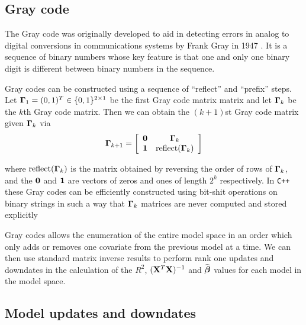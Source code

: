 \documentclass{article}[12pt]
\begin{document}
 
\subsection{Gray code} 
\label{sec:GrayCode}


The Gray code was originally developed to aid in detecting errors in analog to digital conversions in
communications systems by Frank Gray in 1947 \cite[][Section 22.3]{PressEtal2007}. It is a sequence of binary numbers whose key feature is that
one and only one binary digit is different between binary numbers in the sequence. 

Gray codes can be constructed using a sequence of ``reflect'' and ``prefix'' steps.
Let ${\boldsymbol \Gamma}_1 = (0,1)^T \in \{0,1\}^{2\times 1}$ be the first Gray code matrix matrix and let ${\boldsymbol \Gamma}_k$ be the $k$th Gray code matrix. Then we can obtain the $(k+1)$st Gray code matrix given ${\boldsymbol \Gamma}_k$ via 
$$
\displaystyle {\boldsymbol\Gamma}_{k+1} = \left[\begin{array}{cc}
{\bf0} & {\boldsymbol \Gamma}_k \\
{\bf 1}  & \mbox{reflect}({\boldsymbol \Gamma}_k)
\end{array} \right]
$$ 

\noindent where $\mbox{reflect}({\boldsymbol \Gamma}_k)$ is the matrix obtained by reversing the order of rows of ${\boldsymbol \Gamma}_k$, and the ${\bf 0}$ and ${\bf 1}$ are vectors of zeros and ones
of length $2^k$ respectively. In {\tt C++} these Gray codes can be efficiently constructed
using bit-shit operations on binary strings in such a way that ${\boldsymbol \Gamma}_{k}$
matrices are never computed and stored explicitly

Gray codes allows the enumeration of the entire model space in an order which only adds
or removes one covariate from the previous model at a time. We can then use standard matrix
inverse results to perform rank
one updates and downdates in the calculation of the $R^2$, $({\bf X}^T{\bf X})^{-1}$ and
$\widehat{{\boldsymbol \beta}}$ values for each model in the
model space.


\subsection{Model updates and downdates} 
\end{document}
